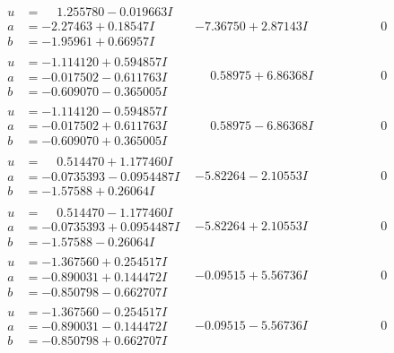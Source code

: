 \documentclass[1p]{elsarticle_modified}
\theoremstyle{definition}
\begin{document}
$$\begin{array}{c|c|c}
\begin{aligned}
u &= \phantom{-}1.255780 - 0.019663 I \\
a &= -2.27463 + 0.18547 I \\
b &= -1.95961 + 0.66957 I\end{aligned}
 & -7.36750 + 2.87143 I & \phantom{-0.000000 } 0 \\ \hline\begin{aligned}
u &= -1.114120 + 0.594857 I \\
a &= -0.017502 - 0.611763 I \\
b &= -0.609070 - 0.365005 I\end{aligned}
 & \phantom{-}0.58975 + 6.86368 I & \phantom{-0.000000 } 0 \\ \hline\begin{aligned}
u &= -1.114120 - 0.594857 I \\
a &= -0.017502 + 0.611763 I \\
b &= -0.609070 + 0.365005 I\end{aligned}
 & \phantom{-}0.58975 - 6.86368 I & \phantom{-0.000000 } 0 \\ \hline\begin{aligned}
u &= \phantom{-}0.514470 + 1.177460 I \\
a &= -0.0735393 - 0.0954487 I \\
b &= -1.57588 + 0.26064 I\end{aligned}
 & -5.82264 - 2.10553 I & \phantom{-0.000000 } 0 \\ \hline\begin{aligned}
u &= \phantom{-}0.514470 - 1.177460 I \\
a &= -0.0735393 + 0.0954487 I \\
b &= -1.57588 - 0.26064 I\end{aligned}
 & -5.82264 + 2.10553 I & \phantom{-0.000000 } 0 \\ \hline\begin{aligned}
u &= -1.367560 + 0.254517 I \\
a &= -0.890031 + 0.144472 I \\
b &= -0.850798 - 0.662707 I\end{aligned}
 & -0.09515 + 5.56736 I & \phantom{-0.000000 } 0 \\ \hline\begin{aligned}
u &= -1.367560 - 0.254517 I \\
a &= -0.890031 - 0.144472 I \\
b &= -0.850798 + 0.662707 I\end{aligned}
 & -0.09515 - 5.56736 I & \phantom{-0.000000 } 0 \\ \hline\begin{aligned}

\end{aligned}
\end{array}$$
\end{document}
